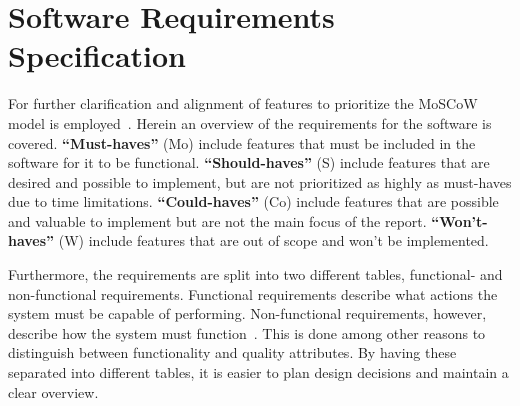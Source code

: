 \section{Software Requirements Specification}\label{sec:software-requirements-specification}

For further clarification and alignment of features to prioritize the MoSCoW model is employed~\cite{hudaib2018}.
Herein an overview of the requirements for the software is covered.
\textbf{``Must-haves''} (Mo) include features that must be included in the software for it to be functional.
\textbf{``Should-haves''} (S) include features that are desired and possible to implement, but are not prioritized as
highly as must-haves due to time limitations.
\textbf{``Could-haves''} (Co) include features that are possible and valuable to implement but are not the main
focus of the report.
\textbf{``Won't-haves''} (W) include features that are out of scope and won't be implemented.

Furthermore, the requirements are split into two different tables, functional- and non-functional requirements.
Functional requirements describe what actions the system must be capable of performing.
Non-functional requirements, however, describe how the system must function~\cite{benyon2019}.
This is done among other reasons to distinguish between functionality and quality attributes.
By having these separated into different tables, it is easier to plan design decisions and maintain a clear overview.

